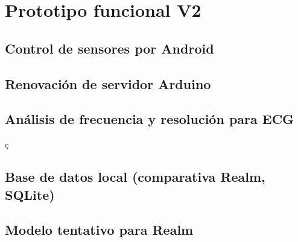 \chapter{Prototipo funcional V2}\label{proto2}

\section{Control de sensores por Android}



\section{Renovación de servidor Arduino}



\section{Análisis de frecuencia y resolución para ECG}ç



\section{Base de datos local (comparativa Realm, SQLite) }



\section{Modelo tentativo para Realm}